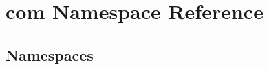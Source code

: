 \hypertarget{namespacecom}{}\section{com Namespace Reference}
\label{namespacecom}
\subsection*{Namespaces}
\begin{DoxyCompactItemize}
\end{DoxyCompactItemize}
